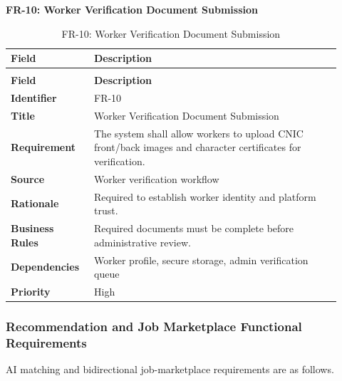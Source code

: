 \documentclass[12pt,a4paper]{article}
\begin{document}
\noindent\textbf{FR-10: Worker Verification Document Submission}\par
\vspace{4pt}
\begingroup\small\setlength{\tabcolsep}{4pt}\renewcommand{\arraystretch}{1.15}
\begin{longtable}{|>{\raggedright\arraybackslash}p{0.22\linewidth}|>{\raggedright\arraybackslash}p{0.70\linewidth}|}
\caption{FR-10: Worker Verification Document Submission}\label{tab:fr-10}\\
\hline
\textbf{Field} & \textbf{Description} \\ \hline
\endfirsthead
\multicolumn{2}{c}{Table \thetable\ Worker Verification Document Submission (continued)}\\
\hline
\textbf{Field} & \textbf{Description} \\ \hline
\endhead
\textbf{Identifier} & FR-10 \\ \hline
\textbf{Title} & Worker Verification Document Submission \\ \hline
\textbf{Requirement} & The system shall allow workers to upload CNIC front/\allowbreak{}back images and character certificates for verification. \\ \hline
\textbf{Source} & Worker verification workflow \\ \hline
\textbf{Rationale} & Required to establish worker identity and platform trust. \\ \hline
\textbf{Business Rules} & Required documents must be complete before administrative review. \\ \hline
\textbf{Dependencies} & Worker profile, secure storage, admin verification queue \\ \hline
\textbf{Priority} & High \\ \hline
\end{longtable}
\endgroup
\clearpage

\subsubsection{Recommendation and Job Marketplace Functional Requirements}
AI matching and bidirectional job-marketplace requirements are as follows.
\end{document}
